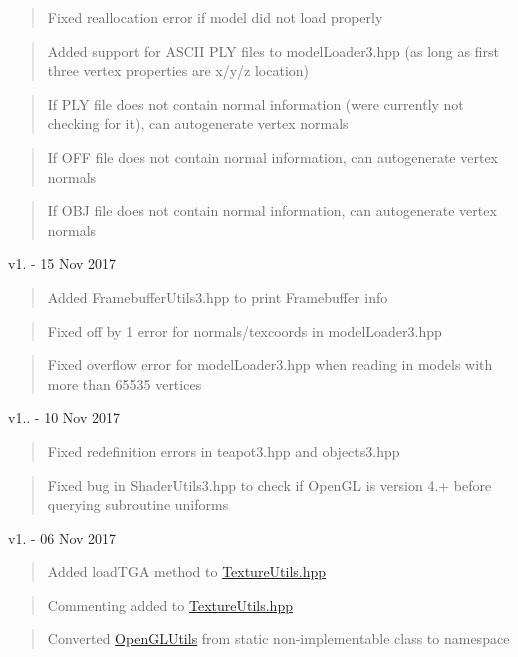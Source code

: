 \begin{quote}
Fixed reallocation error if model did not load properly \end{quote}
\begin{quote}
Added support for ASCII PLY files to model\+Loader3.\+hpp (as long as first three vertex properties are x/y/z location) \end{quote}
\begin{quote}
If PLY file does not contain normal information (we\textquotesingle{}re currently not checking for it), can autogenerate vertex normals \end{quote}
\begin{quote}
If OFF file does not contain normal information, can autogenerate vertex normals \end{quote}
\begin{quote}
If OBJ file does not contain normal information, can autogenerate vertex normals \end{quote}
v1. -\/ 15 Nov 2017 \begin{quote}
Added Framebuffer\+Utils3.\+hpp to print Framebuffer info \end{quote}
\begin{quote}
Fixed off by 1 error for normals/texcoords in model\+Loader3.\+hpp \end{quote}
\begin{quote}
Fixed overflow error for model\+Loader3.\+hpp when reading in models with more than 65535 vertices \end{quote}
v1.. -\/ 10 Nov 2017 \begin{quote}
Fixed redefinition errors in teapot3.\+hpp and objects3.\+hpp \end{quote}
\begin{quote}
Fixed bug in Shader\+Utils3.\+hpp to check if Open\+GL is version 4.+ before querying subroutine uniforms \end{quote}
v1. -\/ 06 Nov 2017 \begin{quote}
Added load\+TGA method to \mbox{\hyperlink{_texture_utils_8hpp}{Texture\+Utils.\+hpp}} \end{quote}
\begin{quote}
Commenting added to \mbox{\hyperlink{_texture_utils_8hpp}{Texture\+Utils.\+hpp}} \end{quote}
\begin{quote}
Converted \mbox{\hyperlink{namespace_open_g_l_utils}{Open\+GLUtils}} from static non-\/implementable class to namespace \end{quote}
